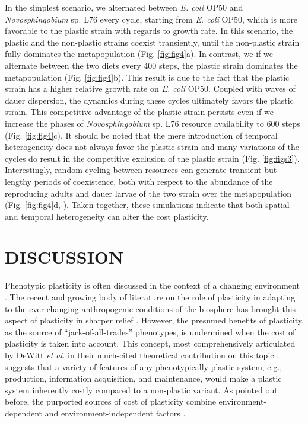 \documentclass[10pt,letterpaper]{article}
\newcommand{\ecoli}{\emph{E. coli} OP50}
\newcommand{\novo}{\emph{Novosphingobium} sp. L76}
\begin{document}
\hspace{5cm}

In the simplest scenario, we alternated between \ecoli{} and \novo{} every cycle, starting from \ecoli{}, which is more favorable to the plastic strain with regards to growth rate. In this scenario, the plastic and the non-plastic strains coexist transiently, until the non-plastic strain fully dominates the metapopulation (Fig. \ref{fig:fig4}a). In contrast, we if we alternate between the two diets every 400 steps, the plastic strain dominates the metapopulation (Fig. \ref{fig:fig4}b). This result is due to the fact that the plastic strain has a higher relative growth rate on \ecoli{}. Coupled with waves of dauer dispersion, the dynamics during these cycles ultimately favors the plastic strain. This competitive advantage of the plastic strain persists even if we increase the phases of \novo{} resource availability to 600 steps (Fig. \ref{fig:fig4}c). It should be noted that the mere introduction of temporal heterogeneity does not always favor the plastic strain and many variations of the cycles do result in the competitive exclusion of the plastic strain (Fig. \ref{fig:figs3}). Interestingly, random cycling between resources can generate transient but lengthy periods of coexistence, both with respect to the abundance of the reproducing adults and dauer larvae of the two strain over the metapopulation (Fig. \ref{fig:fig4}d,  ). Taken together, these simulations indicate that both spatial and temporal heterogeneity can alter the cost plasticity.


\section*{DISCUSSION}

Phenotypic plasticity is often discussed in the context of a changing environment \cite{Richards2006aa, Schneider2022a}. The recent and growing body of literature on the role of plasticity in adapting to the ever-changing anthropogenic conditions of the biosphere has brought this aspect of plasticity in sharper relief \cite{Chown2007aa, Charmantier2008a, Nicotra2010aa, Chevin2013aa, Bonamour2019aa, Scheiner2020aa}. However, the presumed benefits of plasticity, as the source of ``jack-of-all-trades'' phenotypes, is undermined when the cost of plasticity is taken into account. This concept, most comprehensively articulated by DeWitt \emph{et al.} in their much-cited theoretical contribution on this topic \cite{DeWitt1998}, suggests that a variety of features of any phenotypically-plastic system, e.g., production, information acquisition, and maintenance, would make a plastic system inherently costly compared to a non-plastic variant. As pointed out before, the purported sources of cost of plasticity combine environment-dependent and environment-independent factors \cite{Auld2010aa}.
\end{document}
